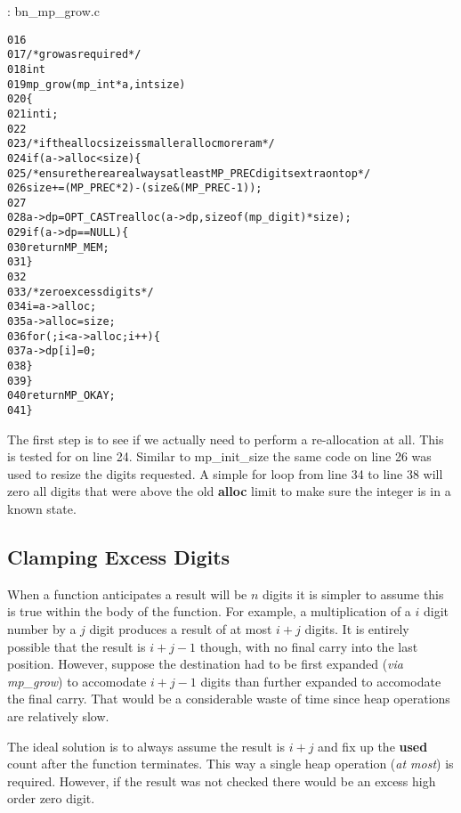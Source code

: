 \documentclass[b5paper]{book}
\begin{document}
\vspace{+3mm}\begin{small}
\hspace{-5.1mm}{\bf File}: bn\_mp\_grow.c
\vspace{-3mm}
\begin{alltt}
016   
017   /* grow as required */
018   int
019   mp_grow (mp_int * a, int size)
020   \{
021     int     i;
022   
023     /* if the alloc size is smaller alloc more ram */
024     if (a->alloc < size) \{
025       /* ensure there are always at least MP_PREC digits extra on top */
026       size += (MP_PREC * 2) - (size & (MP_PREC - 1));     
027   
028       a->dp = OPT_CAST realloc (a->dp, sizeof (mp_digit) * size);
029       if (a->dp == NULL) \{
030         return MP_MEM;
031       \}
032   
033       /* zero excess digits */
034       i        = a->alloc;
035       a->alloc = size;
036       for (; i < a->alloc; i++) \{
037         a->dp[i] = 0;
038       \}
039     \}
040     return MP_OKAY;
041   \}
\end{alltt}
\end{small}

The first step is to see if we actually need to perform a re-allocation at all.  This is tested for on line 
24.  Similar to mp\_init\_size the same code on line 26 was used to resize the 
digits requested.  A simple for loop from line 34 to line 38 will zero all digits that were above the 
old \textbf{alloc} limit to make sure the integer is in a known state.

\subsection{Clamping Excess Digits}
When a function anticipates a result will be $n$ digits it is simpler to assume this is true within the body of 
the function.  For example, a multiplication of a $i$ digit number by a $j$ digit produces a result of at most 
$i + j$ digits.  It is entirely possible that the result is $i + j - 1$ though, with no final carry into the last 
position.  However, suppose the destination had to be first expanded (\textit{via mp\_grow}) to accomodate $i + j - 1$
digits than further expanded to accomodate the final carry.  That would be a considerable waste of time since heap
operations are relatively slow.

The ideal solution is to always assume the result is $i + j$ and fix up the \textbf{used} count after the function
terminates.  This way a single heap operation (\textit{at most}) is required.  However, if the result was not checked
there would be an excess high order zero digit.  
\end{document}
